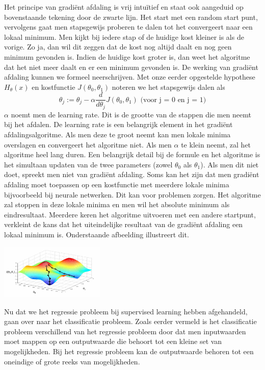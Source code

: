 %
 Het principe van gradi\"ent afdaling is vrij intu\"itief en staat ook aangeduid op bovenstaande tekening door de zwarte lijn. Het start met een random start punt, vervolgens gaat men stapsgewijs proberen te dalen tot het convergeert naar een lokaal minimum. Men kijkt bij iedere stap of de huidige kost kleiner is als de vorige. Zo ja, dan wil dit zeggen dat de kost nog altijd daalt en nog geen minimum gevonden is. Indien de huidige kost groter is, dan weet het algoritme dat het niet meer daalt en er een minimum gevonden is.
\newline
De werking van gradi\"ent afdaling kunnen we formeel neerschrijven. Met onze eerder opgestelde hypothese $H_{\theta}(x)$ en kostfunctie $J(\theta_{0},\theta_{1})$ noteren we het stapsgewijs dalen als \\
\[ \theta_{j} := \theta_{j} - \alpha\frac{d}{d\theta_{j}}J(\theta_{0},\theta_{1})   \text{  (voor j = 0 en j = 1)}\] 
\newline
$\alpha$ noemt men de learning rate. Dit is de grootte van de stappen die men neemt bij het afdalen. De learning rate is een belangrijk element in het gradi\"ent afdalingsalgoritme. Als men deze te groot neemt kan men lokale minima overslagen en convergeert het algoritme niet. Als men $\alpha$  te klein neemt, zal het algoritme heel lang duren. 
\newline
Een belangrijk detail bij de formule en het algoritme is het simultaan updaten van de twee parameters (zowel $\theta_{0}$ als $\theta_{1}$). Als men dit niet doet, spreekt men niet van gradi\"ent afdaling.
\newline
Soms kan het zijn dat men gradi\"ent afdaling moet toepassen op een kostfunctie met meerdere lokale minima bijvoorbeeld bij neurale netwerken. Dit kan voor problemen zorgen. Het algoritme zal stoppen in deze lokale minima en men wil het absolute minimum als eindresultaat. Meerdere keren het algoritme uitvoeren met een andere startpunt, verkleint de kans dat het uiteindelijke resultaat van de gradi\"ent afdaling een lokaal minimum is. Onderstaande afbeelding illustreert dit.
\begin{center}
  \includegraphics[width=5cm]{3d_plot}
\end{center}
Nu dat we het regressie probleem bij supervised learning hebben afgehandeld, gaan over naar het classificatie probleem. Zoals eerder vermeld is het classificatie probleem verschillend van het regressie probleem door dat men inputwaarden moet mappen op een outputwaarde die behoort tot een kleine set van mogelijkheden. Bij het regressie probleem kan de outputwaarde behoren tot een oneindige of grote reeks van mogelijkheden.

